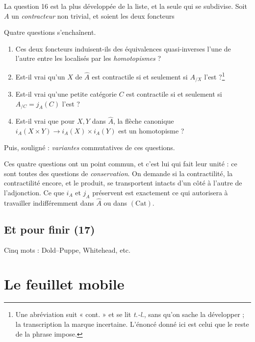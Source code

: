 \documentclass[11pt,a4paper]{article}
\begin{document}
La question 16 est la plus développée de la liste, et la seule qui se
subdivise. Soit $A$ un \emph{contracteur} non trivial, et soient les deux
foncteurs


Quatre questions s'enchaînent.

\begin{enumerate}
\item Ces deux foncteurs induisent-ils des équivalences quasi-inverses l'une de
l'autre entre les localisés par les \emph{homotopismes} ?
\item Est-il vrai qu'un $X$ de $\hat{A}$ est contractile si et seulement si
$A_{/X}$ l'est ?\footnote{Une abréviation suit « cont. » et se lit
\emph{t.-l.}, sans qu'on sache la développer ; la transcription la marque
incertaine. L'énoncé donné ici est celui que le reste de la phrase impose.}
\item Est-il vrai qu'une petite catégorie $C$ est contractile si et seulement si
$A_{/C} = j_{A}(C)$ l'est ?
\item Est-il vrai que pour $X, Y$ dans $\hat{A}$, la flèche canonique
$i_{A}(X \times Y) \to i_{A}(X) \times i_{A}(Y)$ est un homotopisme ?
\end{enumerate}

Puis, souligné : \emph{variantes} commutatives de ces questions.

Ces quatre questions ont un point commun, et c'est lui qui fait leur unité : ce
sont toutes des questions de \emph{conservation}. On demande si la
contractilité, la contractilité encore, et le produit, se transportent
intacts d'un côté à l'autre de l'adjonction. Ce que $i_{A}$ et $j_{A}$
préservent est exactement ce qui autorisera à travailler indifféremment dans
$\hat{A}$ ou dans $(\mathrm{Cat})$.

\subsection*{Et pour finir (17)}

Cinq mots : Dold--Puppe, Whitehead, etc.

\section*{Le feuillet mobile}
\end{document}
